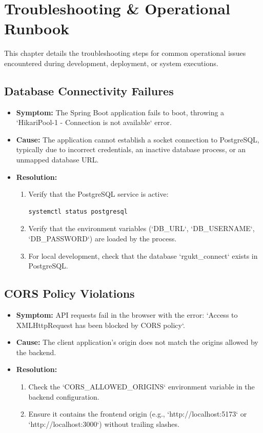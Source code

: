 \chapter{Troubleshooting \& Operational Runbook}
\label{ch:troubleshooting}

This chapter details the troubleshooting steps for common operational issues encountered during development, deployment, or system executions.

\section{Database Connectivity Failures}
\begin{itemize}
    \item \textbf{Symptom:} The Spring Boot application fails to boot, throwing a `HikariPool-1 - Connection is not available` error.
    \item \textbf{Cause:} The application cannot establish a socket connection to PostgreSQL, typically due to incorrect credentials, an inactive database process, or an unmapped database URL.
    \item \textbf{Resolution:}
    \begin{enumerate}
        \item Verify that the PostgreSQL service is active:
        \begin{lstlisting}[language=bash]
        systemctl status postgresql
        \end{lstlisting}
        \item Verify that the environment variables (`DB\_URL`, `DB\_USERNAME`, `DB\_PASSWORD`) are loaded by the process.
        \item For local development, check that the database `rgukt\_connect` exists in PostgreSQL.
    \end{enumerate}
\end{itemize}

\section{CORS Policy Violations}
\begin{itemize}
    \item \textbf{Symptom:} API requests fail in the browser with the error: `Access to XMLHttpRequest has been blocked by CORS policy`.
    \item \textbf{Cause:} The client application's origin does not match the origins allowed by the backend.
    \item \textbf{Resolution:}
    \begin{enumerate}
        \item Check the `CORS\_ALLOWED\_ORIGINS` environment variable in the backend configuration.
        \item Ensure it contains the frontend origin (e.g., `http://localhost:5173` or `http://localhost:3000`) without trailing slashes.
    \end{enumerate}
\end{itemize}

